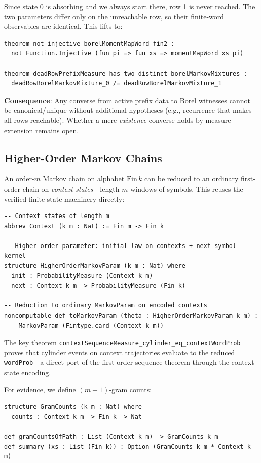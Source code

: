 \documentclass[11pt,a4paper]{article}
\theoremstyle{definition}
\begin{document}
Since state 0 is absorbing and we always start there, row 1 is never reached.
The two parameters differ only on the unreachable row, so their finite-word
observables are identical. This lifts to:

\begin{lstlisting}
theorem not_injective_borelMomentMapWord_fin2 :
  not Function.Injective (fun pi => fun xs => momentMapWord xs pi)

theorem deadRowPrefixMeasure_has_two_distinct_borelMarkovMixtures :
  deadRowBorelMarkovMixture_0 /= deadRowBorelMarkovMixture_1
\end{lstlisting}

\textbf{Consequence}: Any converse from active prefix data to Borel witnesses
cannot be canonical/unique without additional hypotheses (e.g., recurrence that
makes all rows reachable). Whether a mere \emph{existence} converse holds by
measure extension remains open.

\subsection{Higher-Order Markov Chains}

An order-$m$ Markov chain on alphabet $\mathrm{Fin}\,k$ can be reduced to an
ordinary first-order chain on \emph{context states}---length-$m$ windows of
symbols. This reuses the verified finite-state machinery directly:

\begin{lstlisting}
-- Context states of length m
abbrev Context (k m : Nat) := Fin m -> Fin k

-- Higher-order parameter: initial law on contexts + next-symbol kernel
structure HigherOrderMarkovParam (k m : Nat) where
  init : ProbabilityMeasure (Context k m)
  next : Context k m -> ProbabilityMeasure (Fin k)

-- Reduction to ordinary MarkovParam on encoded contexts
noncomputable def toMarkovParam (theta : HigherOrderMarkovParam k m) :
    MarkovParam (Fintype.card (Context k m))
\end{lstlisting}

The key theorem \texttt{contextSequenceMeasure\_cylinder\_eq\_contextWordProb}
proves that cylinder events on context trajectories evaluate to the reduced
\texttt{wordProb}---a direct port of the first-order sequence theorem through
the context-state encoding.

For evidence, we define $(m+1)$-gram counts:

\begin{lstlisting}
structure GramCounts (k m : Nat) where
  counts : Context k m -> Fin k -> Nat

def gramCountsOfPath : List (Context k m) -> GramCounts k m
def summary (xs : List (Fin k)) : Option (GramCounts k m * Context k m)
\end{lstlisting}
\end{document}
